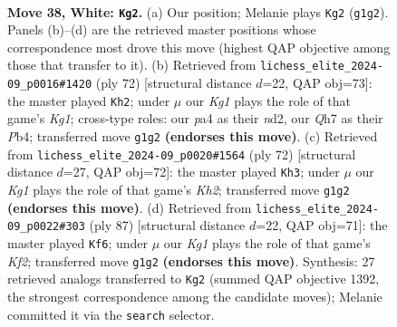 \documentclass[11pt]{article}
\begin{document}
\clearpage

\begin{figure}[p]\centering
\begin{subfigure}{0.46\textwidth}\centering
\resizebox{\linewidth}{!}{%
\newchessgame
\chessboard[
  setfen={r7/7Q/3pkp2/8/p7/6P1/P4P1P/4q1K1 w - - 1 38},
  showmover=false,
  pgfstyle=straightmove, color=movearrow, markmove={g1-g2}
]}
\caption{}
\end{subfigure}\hfill
\begin{subfigure}{0.46\textwidth}\centering
\resizebox{\linewidth}{!}{%
\newchessgame
\chessboard[
  setfen={6k1/6pp/8/1Q6/PP6/7P/3n1PP1/4q1K1 w - - 1 37},
  showmover=false,
  pgfstyle=straightmove, color=movearrow, markmove={g1-h2}
]}
\caption{}
\end{subfigure}
\\[4pt]
\begin{subfigure}{0.46\textwidth}\centering
\resizebox{\linewidth}{!}{%
\newchessgame
\chessboard[
  setfen={5k2/5p1p/8/p3Q3/P6P/6P1/5q1K/8 w - - 0 37},
  showmover=false,
  pgfstyle=straightmove, color=movearrow, markmove={h2-h3}
]}
\caption{}
\end{subfigure}\hfill
\begin{subfigure}{0.46\textwidth}\centering
\resizebox{\linewidth}{!}{%
\newchessgame
\chessboard[
  setfen={8/3Q1k1p/6p1/8/7P/3p2PK/1P2q3/8 b - - 3 44},
  showmover=false,
  pgfstyle=straightmove, color=movearrow, markmove={f7-f6}
]}
\caption{}
\end{subfigure}
\caption{\textbf{Move 38, White: \texttt{Kg2}.} (a) Our position; Melanie plays \texttt{Kg2} (\texttt{g1g2}). Panels (b)--(d) are the retrieved master positions whose correspondence most drove this move (highest QAP objective among those that transfer to it). (b) Retrieved from \texttt{lichess\_elite\_2024-09\_p0016\#1420} (ply 72) [structural distance $d$=22, QAP obj=73]: the master played \texttt{Kh2}; under $\mu$ our \emph{Kg1} plays the role of that game's \emph{Kg1}; cross-type roles: our \emph{p}a4 as their \emph{n}d2, our \emph{Q}h7 as their \emph{P}b4; transferred move \texttt{g1g2} \textbf{(endorses this move)}. (c) Retrieved from \texttt{lichess\_elite\_2024-09\_p0020\#1564} (ply 72) [structural distance $d$=27, QAP obj=72]: the master played \texttt{Kh3}; under $\mu$ our \emph{Kg1} plays the role of that game's \emph{Kh2}; transferred move \texttt{g1g2} \textbf{(endorses this move)}. (d) Retrieved from \texttt{lichess\_elite\_2024-09\_p0022\#303} (ply 87) [structural distance $d$=22, QAP obj=71]: the master played \texttt{Kf6}; under $\mu$ our \emph{Kg1} plays the role of that game's \emph{Kf2}; transferred move \texttt{g1g2} \textbf{(endorses this move)}. Synthesis: 27 retrieved analogs transferred to \texttt{Kg2} (summed QAP objective 1392, the strongest correspondence among the candidate moves); Melanie committed it via the \texttt{search} selector.}
\label{fig:thought-m74}
\end{figure}
\end{document}
